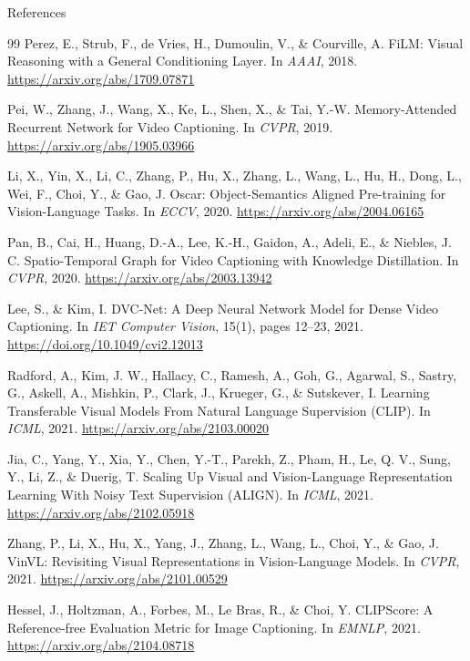\begin{frame}[allowframebreaks]{References}
\begin{thebibliography}{99}
Perez, E., Strub, F., de Vries, H., Dumoulin, V., \& Courville, A.
\newblock FiLM: Visual Reasoning with a General Conditioning Layer.
\newblock In \emph{AAAI}, 2018.
\newblock \url{https://arxiv.org/abs/1709.07871}

Pei, W., Zhang, J., Wang, X., Ke, L., Shen, X., \& Tai, Y.-W.
\newblock Memory-Attended Recurrent Network for Video Captioning.
\newblock In \emph{CVPR}, 2019.
\newblock \url{https://arxiv.org/abs/1905.03966}

Li, X., Yin, X., Li, C., Zhang, P., Hu, X., Zhang, L., Wang, L., Hu, H., Dong, L., Wei, F., Choi, Y., \& Gao, J.
\newblock Oscar: Object-Semantics Aligned Pre-training for Vision-Language Tasks.
\newblock In \emph{ECCV}, 2020.
\newblock \url{https://arxiv.org/abs/2004.06165}

Pan, B., Cai, H., Huang, D.-A., Lee, K.-H., Gaidon, A., Adeli, E., \& Niebles, J. C.
\newblock Spatio-Temporal Graph for Video Captioning with Knowledge Distillation.
\newblock In \emph{CVPR}, 2020.
\newblock \url{https://arxiv.org/abs/2003.13942}

Lee, S., \& Kim, I.
\newblock DVC-Net: A Deep Neural Network Model for Dense Video Captioning.
\newblock In \emph{IET Computer Vision}, 15(1), pages 12--23, 2021.
\newblock \url{https://doi.org/10.1049/cvi2.12013}

Radford, A., Kim, J. W., Hallacy, C., Ramesh, A., Goh, G., Agarwal, S., Sastry, G., Askell, A., Mishkin, P., Clark, J., Krueger, G., \& Sutskever, I.
\newblock Learning Transferable Visual Models From Natural Language Supervision (CLIP).
\newblock In \emph{ICML}, 2021.
\newblock \url{https://arxiv.org/abs/2103.00020}

Jia, C., Yang, Y., Xia, Y., Chen, Y.-T., Parekh, Z., Pham, H., Le, Q. V., Sung, Y., Li, Z., \& Duerig, T.
\newblock Scaling Up Visual and Vision-Language Representation Learning With Noisy Text Supervision (ALIGN).
\newblock In \emph{ICML}, 2021.
\newblock \url{https://arxiv.org/abs/2102.05918}

Zhang, P., Li, X., Hu, X., Yang, J., Zhang, L., Wang, L., Choi, Y., \& Gao, J.
\newblock VinVL: Revisiting Visual Representations in Vision-Language Models.
\newblock In \emph{CVPR}, 2021.
\newblock \url{https://arxiv.org/abs/2101.00529}

Hessel, J., Holtzman, A., Forbes, M., Le Bras, R., \& Choi, Y.
\newblock CLIPScore: A Reference-free Evaluation Metric for Image Captioning.
\newblock In \emph{EMNLP}, 2021.
\newblock \url{https://arxiv.org/abs/2104.08718}


\end{thebibliography}
\end{frame}
